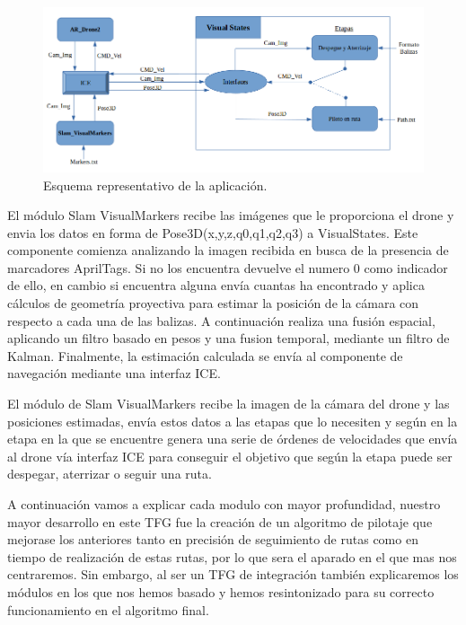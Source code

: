 \begin{figure}[H]
	\begin{center}
		\includegraphics[width=1.1\textwidth]{imag/IMG30.png}
				\caption{Esquema representativo de la aplicación.}
		\label{fig:Esquema representativo.}	
	\end{center}
\end{figure}

\hspace{1cm} El módulo Slam VisualMarkers recibe las imágenes que le proporciona el drone y envia los datos en forma de Pose3D(x,y,z,q0,q1,q2,q3) a VisualStates. Este componente comienza analizando la imagen recibida en busca de la presencia de marcadores AprilTags. Si no los encuentra devuelve el numero 0 como indicador de ello, en cambio si encuentra alguna envía cuantas ha encontrado y aplica cálculos de geometría proyectiva para estimar la posición de la cámara con respecto a cada una de las balizas. A continuación realiza una fusión espacial, aplicando un filtro basado en pesos y una fusion temporal, mediante un filtro de Kalman. Finalmente, la estimación calculada se envía al componente de navegación mediante una interfaz ICE.

\hspace{1cm} El módulo de Slam VisualMarkers recibe la imagen de la cámara del drone y las posiciones estimadas, envía estos datos a las etapas que lo necesiten y según en la etapa en la que se encuentre genera una serie de órdenes de velocidades que envía al drone vía interfaz ICE para conseguir el objetivo que según la etapa puede ser despegar, aterrizar o seguir una ruta.

\hspace{1cm} A continuación vamos a explicar cada modulo con mayor profundidad, nuestro mayor desarrollo en este TFG fue la creación de un algoritmo de pilotaje que mejorase los anteriores tanto en precisión de seguimiento de rutas como en tiempo de realización de estas rutas, por lo que sera el aparado en el que mas nos centraremos. Sin embargo, al ser un TFG de integración también explicaremos los módulos en los que nos hemos basado y hemos resintonizado para su correcto funcionamiento en el algoritmo final. 

